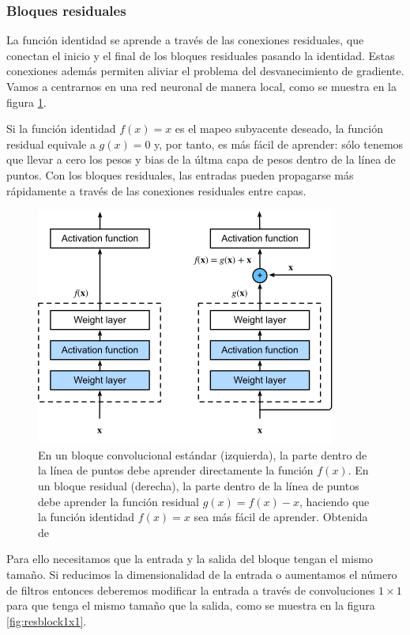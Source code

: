 \subsubsection{Bloques residuales}

La función identidad se aprende a través de las conexiones residuales, que conectan el inicio y el final de los bloques residuales pasando la identidad. Estas conexiones además permiten aliviar el problema del desvanecimiento de gradiente. Vamos a centrarnos en una red neuronal de manera local, como se muestra en la figura \ref{fig:resblock}. 

Si la función identidad $f(x)=x$ es el mapeo subyacente deseado, la función residual equivale a $g(x)=0$ y, por tanto, es más fácil de aprender: sólo tenemos que llevar a cero los pesos y bias de la últma capa de pesos dentro de la línea de puntos. Con los bloques residuales, las entradas pueden propagarse más rápidamente a través de las conexiones residuales entre capas.

\begin{figure}
    \centering
    \includegraphics[width=0.75\linewidth]{Plantilla_TFG_latex//imagenes//Inf//2.Fund/resblock.png}
    \caption{En un bloque convolucional estándar (izquierda), la parte dentro de la línea de puntos debe aprender directamente la función $f(x)$. En un bloque residual (derecha), la parte dentro de la línea de puntos debe aprender la función residual $g(x)=f(x)-x$, haciendo que la función identidad $f(x)=x$ sea más fácil de aprender. Obtenida de \cite{divedeeplearning}}
    \label{fig:resblock}
\end{figure}

Para ello necesitamos que la entrada y la salida del bloque tengan el mismo tamaño. Si reducimos la dimensionalidad de la entrada o aumentamos el número de filtros entonces deberemos modificar la entrada a través de convoluciones $1 \times 1$ para que tenga el mismo tamaño que la salida, como se muestra en la figura \ref{fig:resblock1x1}.

